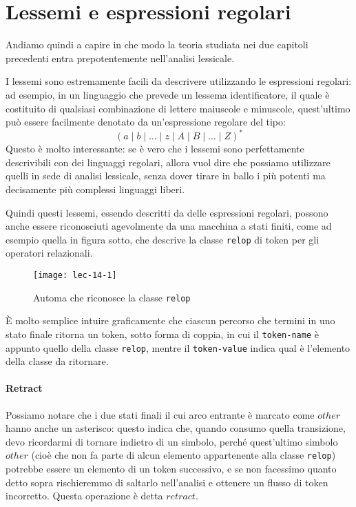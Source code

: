 \documentclass[class=book, crop=false, oneside, 12pt]{standalone}
\begin{document}
\section{Lessemi e espressioni regolari}
Andiamo quindi a capire in che modo la teoria studiata nei due capitoli precedenti entra prepotentemente nell'analisi lessicale.

I lessemi sono estremamente facili da descrivere utilizzando le espressioni regolari: ad esempio, in un linguaggio che prevede un lessema identificatore, il quale è costituito di qualsiasi combinazione di lettere maiuscole e minuscole, quest'ultimo può essere facilmente denotato da un'espressione regolare del tipo:
\begin{equation*}
    (a \mid b \mid \ldots \mid z \mid A \mid B \mid \ldots \mid Z)^*
\end{equation*}
Questo è molto interessante: se è vero che i lessemi sono perfettamente descrivibili con dei linguaggi regolari, allora vuol dire che possiamo utilizzare quelli in sede di analisi lessicale, senza dover tirare in ballo i più potenti ma decisamente più complessi linguaggi liberi.

Quindi questi lessemi, essendo descritti da delle espressioni regolari, possono anche essere riconosciuti agevolmente da una macchina a stati finiti, come ad esempio quella in figura sotto, che descrive la classe \texttt{relop} di token per gli operatori relazionali.
\begin{figure}[H]
    \centering
    \texttt{[image: lec-14-1]}
    \caption{Automa che riconosce la classe \texttt{relop}}
    \label{automaton-relop}
\end{figure}
È molto semplice intuire graficamente che ciascun percorso che termini in uno stato finale ritorna un token, sotto forma di coppia, in cui il \texttt{token-name} è appunto quello della classe \texttt{relop}, mentre il \texttt{token-value} indica qual è l'elemento della classe da ritornare.

\paragraph{Retract}
Possiamo notare che i due stati finali il cui arco entrante è marcato come \(other\) hanno anche un asterisco: questo indica che, quando consumo quella transizione, devo ricordarmi di tornare indietro di un simbolo, perché quest'ultimo simbolo \(other\) (cioè che non fa parte di alcun elemento appartenente alla classe \texttt{relop}) potrebbe essere un elemento di un token successivo, e se non facessimo quanto detto sopra rischieremmo di saltarlo nell'analisi e ottenere un flusso di token incorretto. Questa operazione è detta \(retract\).
\end{document}
